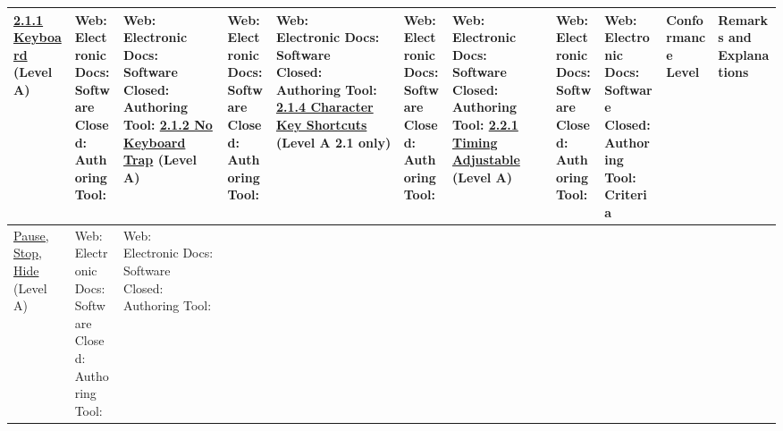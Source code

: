 \documentclass[a4paper]{report}
\begin{document}
\begin{longtable}{|l|l|l|}
 	\hline
 	\href{http://www.w3.org/TR/WCAG20/#keyboard-operation-keyboard-operable}{2.1.1 Keyboard} (Level A) & \makecell{Web: \\ Electronic Docs: \\ Software \\ Closed: \\ Authoring Tool:} & \makecell{Web: \\ Electronic Docs: \\ Software \\ Closed: \\ Authoring Tool:}
 	\hline
 	\href{http://www.w3.org/TR/WCAG20/#keyboard-operation-trapping}{2.1.2 No Keyboard Trap} (Level A) &\makecell{Web: \\ Electronic Docs: \\ Software \\ Closed: \\ Authoring Tool:} & \makecell{Web: \\ Electronic Docs: \\ Software \\ Closed: \\ Authoring Tool:}
 	\hline
 	\href{https://www.w3.org/TR/WCAG21/#character-key-shortcuts}{2.1.4 Character Key Shortcuts} (Level A 2.1 only) &\makecell{Web: \\ Electronic Docs: \\ Software \\ Closed: \\ Authoring Tool:} & \makecell{Web: \\ Electronic Docs: \\ Software \\ Closed: \\ Authoring Tool:}
 	\hline
 	\href{http://www.w3.org/TR/WCAG20/#time-limits-required-behaviors}{2.2.1 Timing Adjustable} (Level A) & \makecell{Web: \\ Electronic Docs: \\ Software \\ Closed: \\ Authoring Tool:} & \makecell{Web: \\ Electronic Docs: \\ Software \\ Closed: \\ Authoring Tool:}
 	\hline \newpage \hline
 	Criteria & Conformance Level & Remarks and Explanations \\
 	\hline
 	\href{http://www.w3.org/TR/WCAG20/#time-limits-pause}{Pause, Stop, Hide} (Level A) & \makecell{Web: \\ Electronic Docs: \\ Software \\ Closed: \\ Authoring Tool:} & \makecell{Web: \\ Electronic Docs: \\ Software \\ Closed: \\ Authoring Tool:}

\end{longtable}
\end{document}
